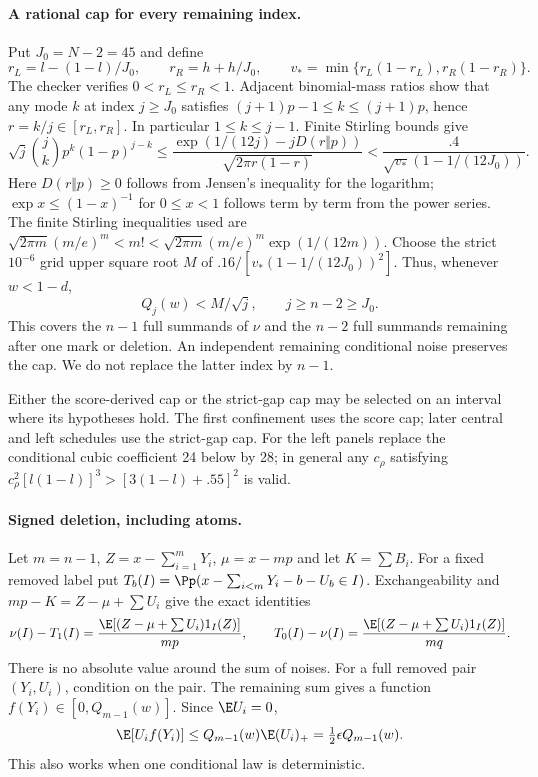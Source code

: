 \paragraph{A rational cap for every remaining index.}
Put $J_0=N-2=45$ and define
\[
 r_L=l-(1-l)/J_0,\qquad r_R=h+h/J_0,\qquad
 v_* =\min\{r_L(1-r_L),r_R(1-r_R)\}.
\]
The checker verifies $0<r_L\le r_R<1$. Adjacent binomial-mass ratios
show that any mode $k$ at index $j\ge J_0$ satisfies
$(j+1)p-1\le k\le(j+1)p$, hence $r=k/j\in[r_L,r_R]$.
In particular $1\le k\le j-1$. Finite Stirling bounds give
\[
 \sqrt j\binom jk p^k(1-p)^{j-k}
 \le\frac{\exp(1/(12j)-jD(r\Vert p))}{\sqrt{2\pi r(1-r)}}
 <\frac{.4}{\sqrt{v_*}(1-1/(12J_0))}.
\]
Here $D(r\Vert p)\ge0$ follows from Jensen's inequality for the logarithm;
$\exp x\le(1-x)^{-1}$ for $0\le x<1$ follows term by term from the
power series. The finite Stirling inequalities used are
$\sqrt{2\pi m}(m/e)^m<m!<\sqrt{2\pi m}(m/e)^m\exp(1/(12m))$.
Choose the strict $10^{-6}$ grid upper square root $M$ of
$.16/[v_*(1-1/(12J_0))^2]$. Thus, whenever $w<1-d$,
\begin{equation}\label{j:local:conf:antichainconcentration}
 Q_j(w)<M/\sqrt j,\qquad j\ge n-2\ge J_0.
\end{equation}
This covers the $n-1$ full summands of $\nu$ and the $n-2$ full summands
remaining after one mark or deletion. An independent remaining conditional
noise preserves the cap. We do not replace the latter index by $n-1$.


Either the score-derived cap or the strict-gap cap may be selected on
an interval where its hypotheses hold. The first confinement uses the
score cap; later central and left schedules use the strict-gap cap.
For the left panels replace the conditional cubic coefficient 24 below
by 28; in general any $c_\rho$ satisfying
$c_\rho^2[l(1-l)]^3>[3(1-l)+.55]^2$ is valid.
\paragraph{Signed deletion, including atoms.}
Let $m=n-1$, $Z=x-\sum_{i=1}^mY_i$, $\mu=x-mp$ and let $K=\sum B_i$.
For a fixed removed label put
$T_b(I)=\Pp(x-\sum_{i<m}Y_i-b-U_b\in I)$.
Exchangeability and $mp-K=Z-\mu+\sum U_i$ give the exact identities
\[
 \nu(I)-T_1(I)=\frac{\E[(Z-\mu+\sum U_i)1_I(Z)]}{mp},\qquad
 T_0(I)-\nu(I)=\frac{\E[(Z-\mu+\sum U_i)1_I(Z)]}{mq}.
\]
There is no absolute value around the sum of noises.
For a full removed pair $(Y_i,U_i)$, condition on the pair. The remaining
sum gives a function $f(Y_i)\in[0,Q_{m-1}(w)]$. Since $\E U_i=0$,
\[
 \E[U_i f(Y_i)]\le Q_{m-1}(w)\E(U_i)_+
 =\tfrac12\epsilon Q_{m-1}(w).
\]
This also works when one conditional law is deterministic.

